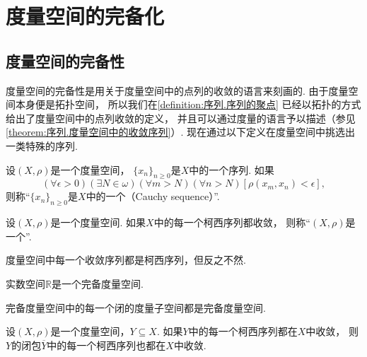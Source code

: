 \section{度量空间的完备化}
\subsection{度量空间的完备性}
度量空间的完备性是用关于度量空间中的点列的收敛的语言来刻画的.
由于度量空间本身便是拓扑空间，
所以我们在\cref{definition:序列.序列的聚点}
已经以拓扑的方式给出了度量空间中的点列收敛的定义，
并且可以通过度量的语言予以描述（参见\cref{theorem:序列.度量空间中的收敛序列}）.
现在通过以下定义在度量空间中挑选出一类特殊的序列.

\begin{definition}\label{definition:度量空间的完备化.度量空间中的柯西序列}
设\((X,\rho)\)是一个度量空间，
\(\{x_n\}_{n\geq0}\)是\(X\)中的一个序列.
如果\begin{equation*}
	(\forall\epsilon>0)
	(\exists N\in\omega)
	(\forall m>N)
	(\forall n>N)
	[\rho(x_m,x_n)<\epsilon],
\end{equation*}
则称“\(\{x_n\}_{n\geq0}\)是\(X\)中的一个（Cauchy sequence）”.
\end{definition}

\begin{definition}\label{definition:度量空间的完备化.完备度量空间}
设\((X,\rho)\)是一个度量空间.
如果\(X\)中的每一个柯西序列都收敛，
则称“\((X,\rho)\)是一个”.
\end{definition}

\begin{proposition}
度量空间中每一个收敛序列都是柯西序列，但反之不然.
\end{proposition}

\begin{example}
实数空间\(\mathbb{R}\)是一个完备度量空间.
\end{example}

\begin{theorem}
完备度量空间中的每一个闭的度量子空间都是完备度量空间.
\end{theorem}

\begin{lemma}
设\((X,\rho)\)是一个度量空间，\(Y \subseteq X\).
如果\(Y\)中的每一个柯西序列都在\(X\)中收敛，
则\(Y\)的闭包\(\overline{Y}\)中的每一个柯西序列也都在\(X\)中收敛.
\end{lemma}

